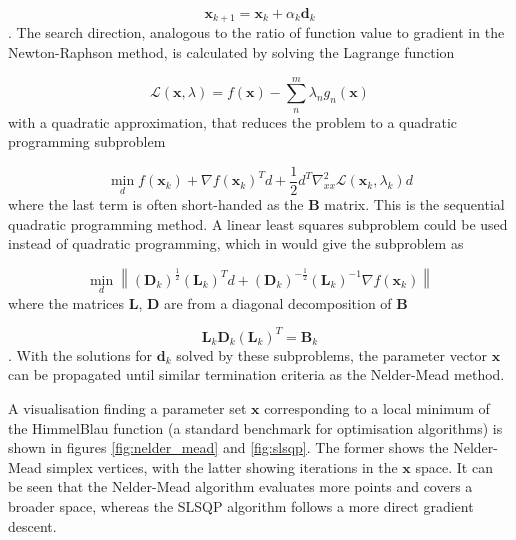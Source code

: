 \begin{equation}
\mathbf{x}_{k+1} = \mathbf{x}_k + \alpha_k \mathbf{d}_k
\end{equation}
%
. The search direction, analogous to the ratio of function value to gradient in 
the Newton-Raphson method, is calculated by solving the Lagrange function

\begin{equation}
\mathcal{L} \left(\mathbf{x}, \lambda\right) = f\left(\mathbf{x}\right) - \sum^m_n \lambda_n g_n \left( \mathbf{x}\right)
\end{equation}
%
with a quadratic approximation, that reduces the problem to a quadratic programming
subproblem

\begin{equation}
\min_d f\left(\mathbf{x}_k\right) + \nabla f\left(\mathbf{x}_k\right)^T d + \frac{1}{2}d^T \nabla^2_{xx} \mathcal{L} \left(\mathbf{x}_k, \lambda_k \right) d
\end{equation}
%
where the last term is often short-handed as the $\mathbf{B}$ matrix. This is the 
sequential quadratic programming method. A linear least squares subproblem could
be used instead of quadratic programming, which in would give the subproblem as

\begin{equation}
\min_d \left\| \left(\mathbf{D}_k\right)^{\frac{1}{2}} \left(\mathbf{L}_k\right)^T d + \left(\mathbf{D}_k\right)^{-\frac{1}{2}}\left(\mathbf{L}_k\right)^{-1}\nabla f \left(\mathbf{x}_k\right)\right\|
\end{equation}
%
where the matrices $\mathbf{L}$, $\mathbf{D}$ are from a diagonal decomposition 
of $\mathbf{B}$

\begin{equation}
\mathbf{L}_k \mathbf{D}_k \left(\mathbf{L}_k\right)^T = \mathbf{B}_k
\end{equation}
%
. With the solutions for $\mathbf{d}_k$ solved by these subproblems, the parameter vector
$\mathbf{x}$ can be propagated until similar termination criteria as the Nelder-Mead
method.

A visualisation finding a parameter set $\mathbf{x}$ corresponding to a local minimum
of the HimmelBlau function (a standard benchmark for optimisation algorithms) is
shown in figures \ref{fig:nelder_mead} and \ref{fig:slsqp}. The former shows the 
Nelder-Mead simplex vertices, with the latter showing iterations in the $\mathbf{x}$
space. It can be seen that the Nelder-Mead algorithm evaluates more points and covers
a broader space, whereas the SLSQP algorithm follows a more direct gradient descent. 

